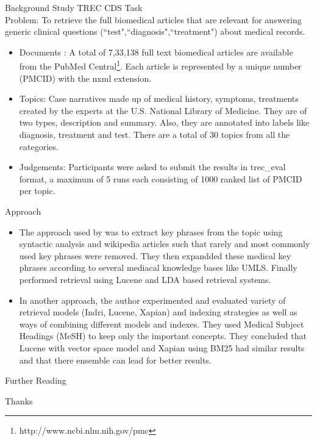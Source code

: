 \documentclass{beamer}
\begin{document}
\begin{frame}{Background Study}
TREC CDS Task\\
Problem: To retrieve the full biomedical articles that are relevant for answering generic clinical questions (``test",``diagnosis",``treatment") about medical records.
\begin{itemize}
\item<1-> Documents : A total of 7,33,138 full text biomedical articles are available from the PubMed Central\footnote{http://www.ncbi.nlm.nih.gov/pmc}. Each article is represented by a unique number (PMCID) with the nxml extension.
\item<2-> Topics: Case narratives made up of medical history, symptoms, treatments created by the experts at the U.S. National Library of Medicine. They are of two types, description and summary. Also, they are annotated into labels like diagnosis, treatment and test. There are a total of 30 topics from all the categories.
\item<3-> Judgements: Participants were asked to submit the results in trec\_eval format, a maximum of 5 runs each consisting of 1000 ranked list of PMCID per topic.
\end{itemize}
\end{frame}

 \begin{frame}{Approach}
 \begin{itemize}
 \item The approach used by \cite{Travis} was to extract key phrases from the topic using syntactic analysis and wikipedia articles such that rarely and most commonly used key phrases were removed. They then expandded these medical key phrases according to several mediacal knowledge bases like UMLS. Finally performed retrieval using Lucene and LDA based retrieval systems.
 \item In another approach, the author experimented and evaluated variety of retrieval models (Indri, Lucene, Xapian) and indexing strategies as well as ways of combining different models and indexes. They used Medical Subject Headings (MeSH) to keep only the important concepts. They concluded that Lucene with vector space model and Xapian using BM25 had similar results and that there ensemble can lead for better results.
 \end{itemize}
 \end{frame}


%

%
%

\begin{frame}{Further Reading}
    \raggedright
    \nocite{*}
    
    
\end{frame}

\begin{frame}
\begin{block}{}
\begin{center}
 Thanks
 \end{center}
 \end{block}
\end{frame}
\end{document}
